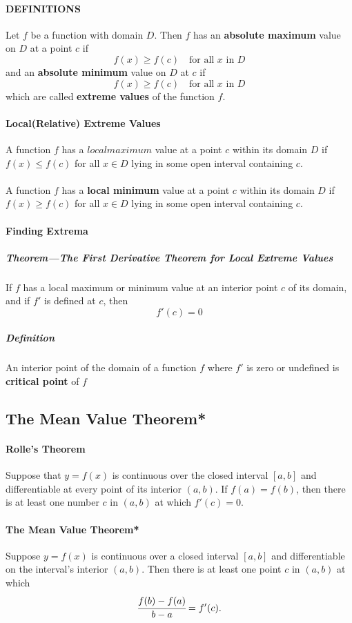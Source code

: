 \documentclass{article}
\begin{document}
            \paragraph{DEFINITIONS} Let $f$ be a function with domain $D$. Then $f$ has an \textbf{absolute maximum} value on $D$ at a point $c$ if
            \[f(x)\ge f(c)\quad \text{for all $x$ in $D$}\]
            and an \textbf{absolute minimum} value on $D$ at $c$ if
            \[f(x)\ge f(c)\quad \text{for all $x$ in $D$}\]
            which are called \textbf{extreme values} of the function $f$.
            \paragraph{Local(Relative) Extreme Values} A function $f$ has a $local maximum$ value at a point $c$ within its domain $D$ if $f(x) \le f(c)$ for all $x\in D$ lying in some open interval containing $c$.\\ \\
            A function $f$ has a \textbf{local minimum} value at a point $c$ within its domain $D$ if $f(x) \ge f(c)$ for all $x\in D$ lying in some open interval containing $c$.

            \paragraph{Finding Extrema}
            \subparagraph{Theorem---The First Derivative Theorem for Local Extreme Values} If $f$ has a local maximum or minimum value at an interior point $c$ of its domain, and if $f'$ is defined at $c$, then
            \[f'(c)=0\]
            \subparagraph{Definition} An interior point of the domain of a function $f$ where $f'$ is zero or undefined is \textbf{critical point} of $f$
        \subsection{The Mean Value Theorem*}
            \paragraph{Rolle's Theorem} Suppose that $y=f(x)$ is continuous over the closed interval $[a,b]$ and differentiable at every point of its interior $(a,b)$. If $f(a)=f(b)$, then there is at least one number $c$ in $(a,b)$ at which $f'(c)=0$.
            \paragraph{The Mean Value Theorem*} Suppose $y=f(x)$ is continuous over a closed interval $[a,b]$ and differentiable on the interval's interior $(a,b)$. Then there is at least one point $c$ in $(a,b)$ at which
            \[\cfrac{f(b)-f(a)}{b-a}=f'(c).\]
\end{document}
